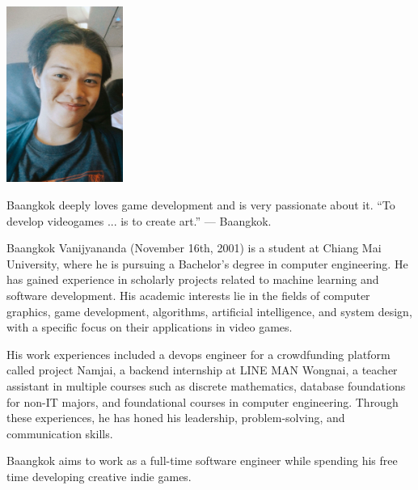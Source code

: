 \documentclass[final, project, english, glossary]{cpecmu}
\begin{document}
\begin{biosketch}
  \begin{center}
    \includegraphics[width=1.5in]{images/bk-image.jpg}
  \end{center}
 
  Baangkok deeply loves game development and is very passionate about it. ``To develop videogames ... is to create art.'' — Baangkok.
 
  Baangkok Vanijyananda (November 16th, 2001) is a student at Chiang Mai University, where he is pursuing a Bachelor's degree in computer engineering. He has gained experience in scholarly projects related to machine learning and software development. His academic interests lie in the fields of computer graphics, game development, algorithms, artificial intelligence, and system design, with a specific focus on their applications in video games.
  
  His work experiences included a devops engineer for a crowdfunding platform called project Namjai, a backend internship at LINE MAN Wongnai, a teacher assistant in multiple courses such as discrete mathematics, database foundations for non-IT majors, and foundational courses in computer engineering. Through these experiences, he has honed his leadership, problem-solving, and communication skills.
  
  Baangkok aims to work as a full-time software engineer while spending his free time developing creative indie games.
  
  \end{biosketch}

\fi %
\end{document}
